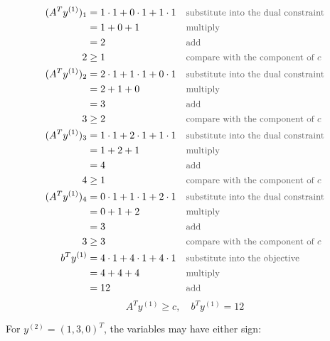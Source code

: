 \documentclass[a4paper,11pt]{article}
\newif\ifexplain
\newcommand{\why}[1]{\text{\small\color{black!65}#1}}
\newcommand{\explain}[1]{\ifexplain\begin{erklbox}#1\end{erklbox}\fi}
\begin{document}
\begin{align*}
(A^Ty^{(1)})_{1} &= 1\cdot 1 + 0\cdot 1 + 1\cdot 1 && \why{substitute into the dual constraint}\\
&= 1 + 0 + 1 && \why{multiply}\\
&= 2 && \why{add}\\
2 &\ge 1 && \why{compare with the component of $c$}\\
(A^Ty^{(1)})_{2} &= 2\cdot 1 + 1\cdot 1 + 0\cdot 1 && \why{substitute into the dual constraint}\\
&= 2 + 1 + 0 && \why{multiply}\\
&= 3 && \why{add}\\
3 &\ge 2 && \why{compare with the component of $c$}\\
(A^Ty^{(1)})_{3} &= 1\cdot 1 + 2\cdot 1 + 1\cdot 1 && \why{substitute into the dual constraint}\\
&= 1 + 2 + 1 && \why{multiply}\\
&= 4 && \why{add}\\
4 &\ge 1 && \why{compare with the component of $c$}\\
(A^Ty^{(1)})_{4} &= 0\cdot 1 + 1\cdot 1 + 2\cdot 1 && \why{substitute into the dual constraint}\\
&= 0 + 1 + 2 && \why{multiply}\\
&= 3 && \why{add}\\
3 &\ge 3 && \why{compare with the component of $c$}\\
b^Ty^{(1)} &= 4\cdot 1 + 4\cdot 1 + 4\cdot 1 && \why{substitute into the objective}\\
&= 4 + 4 + 4 && \why{multiply}\\
&= 12 && \why{add}
\end{align*}
\[\boxed{A^Ty^{(1)}\ge c,\quad b^Ty^{(1)}=12}\]
\explain{Beim dualen Punkt prüfen wir jede Ungleichung. Die linke Seite darf größer als die entsprechende Komponente von $c$ sein; Gleichheit ist nicht verlangt.}
For $y^{(2)}=(1,3,0)^T$, the variables may have either sign:
\end{document}
